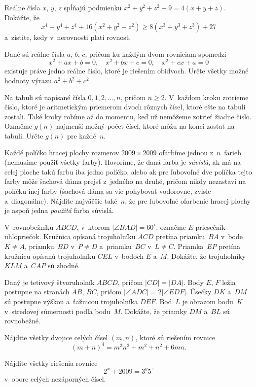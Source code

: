 {%
Reálne čísla $x$, $y$, $z$ spĺňajú podmienku $x^2+y^2+z^2+9 = 4(x+y+z)$. Dokážte, že
$$
x^4+y^4+z^4+16(x^2+y^2+z^2)\ge 8(x^3+y^3+z^3)+27
$$
a~zistite, kedy v~nerovnosti platí rovnosť.}

{%
Dané sú reálne čísla $a$, $b$, $c$, pričom ku každým dvom rovniciam spomedzi
$$
x^2+ax+b=0,\quad x^2+bx+c=0,\quad x^2+cx+a=0
$$
existuje práve jedno reálne číslo, ktoré je riešením obidvoch. Určte všetky možné hodnoty výrazu $a^2+b^2+c^2$.}

{%
Na tabuli sú napísané čísla $0,1,2,\dots,n$, pričom $n\ge 2$. V~každom kroku zotrieme číslo, ktoré je aritmetickým priemerom dvoch rôznych čísel, ktoré ešte na tabuli zostali. Také kroky robíme až do momentu, keď už nemôžeme zotrieť žiadne číslo. Označme $g(n)$ najmenší možný počet čísel, ktoré môžu na konci zostať na tabuli. Určte $g(n)$ pre každé~$n$.}

{%
Každé políčko hracej plochy rozmerov $2009\times 2009$ ofarbíme jednou z~$n$~farieb (nemusíme použiť všetky farby).
Hovoríme, že daná farba je {\it súvislá}, ak má na celej ploche takú farbu iba jedno políčko, alebo ak pre
ľubovoľné dve políčka tejto farby môže šachová dáma prejsť z~jedného na druhé, pričom nikdy nezastaví na políčku inej farby (šachová dáma sa vie pohybovať vodorovne, zvisle a~diagonálne). Nájdite najväčšie také~$n$, že pre ľubovoľné ofarbenie hracej plochy je aspoň jedna {\it použitá} farba súvislá.}

{%
V~rovnobežníku $ABCD$, v~ktorom $|\angle BAD| = 60^\circ$, označme $E$ priesečník uhlopriečok. Kružnica opísaná trojuholníku $ACD$ pretína priamku~$BA$ v~bode $K \ne A$, priamku~$BD$ v~$P \ne D$ a~priamku~$BC$ v~$L \ne C$.
Priamka~$EP$ pretína kružnicu opísanú trojuholníku $CEL$ v~bodoch $E$ a~$M$. Dokážte, že trojuholníky $KLM$ a~$CAP$ sú zhodné.}

{%
Daný je tetivový štvoruholník $ABCD$, pričom $|CD|=|DA|$. Body $E$, $F$ ležia postupne na stranách $AB$, $BC$, pričom $|\angle ADC| = 2|\angle EDF|$. Úsečky $DK$ a~$DM$ sú postupne výškou a~ťažnicou trojuholníka $DEF$.
Bod~$L$ je obrazom bodu~$K$ v~stredovej súmernosti podľa bodu~$M$. Dokážte, že priamky $DM$ a~$BL$ sú rovnobežné.}

{%
Nájdite všetky dvojice celých čísel $(m,n)$, ktoré sú riešením rovnice
$$
(m+n)^4=m^2n^2+m^2+n^2+6mn.
$$}

{%
Nájdite všetky riešenia rovnice
$$
2^x+2009=3^y5^z
$$
v~obore celých nezáporných čísel.}
